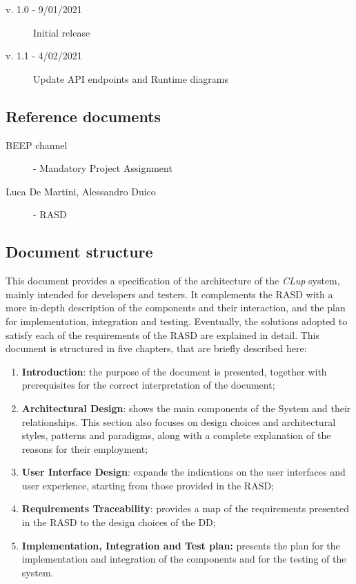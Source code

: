 \begin{description}
    \item[v. 1.0 - 9/01/2021] Initial release
    \item[v. 1.1 - 4/02/2021] Update API endpoints and Runtime diagrams
\end{description} 

\subsection{Reference documents}

\begin{description}
    \item [BEEP channel] - Mandatory Project Assignment
    \item [Luca De Martini, Alessandro Duico] - RASD
\end{description}


\subsection{Document structure}
This document provides a specification of the architecture of the \emph{CLup} system, mainly intended for developers and testers. 
It complements the RASD with a more in-depth description of the components and their interaction, and the plan for implementation, integration and testing. 
Eventually, the solutions adopted to satisfy each of the requirements of the RASD are explained in detail.
This document is structured in five chapters, that are briefly described here:
\begin{enumerate}
\item\textbf{Introduction}: the purpose of the document is presented, together with prerequisites for the correct interpretation of the document;
\item\textbf{Architectural Design}: shows the main components of the System and their relationships. This section also focuses on design choices and architectural styles, patterns and paradigms, along with a complete explanation of the reasons for their employment;
\item\textbf{User Interface Design}: expands the indications on the user interfaces and user experience, starting from those provided in the RASD;
\item\textbf{Requirements Traceability}: provides a map of the requirements presented in the RASD to the design choices of the DD;
\item\textbf{Implementation, Integration and Test plan:} presents the plan for the implementation and integration of the components and for the testing of the system.
\end{enumerate}

